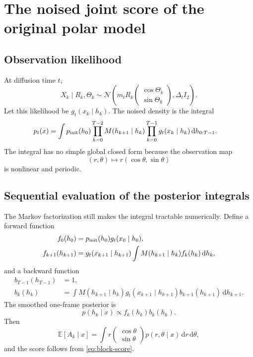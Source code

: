 \documentclass[11pt,a4paper]{article}
\newcommand{\E}{\mathbb{E}}
\newcommand{\N}{\mathcal{N}}
\newcommand{\dd}{\,\mathrm d}
\begin{document}
\section{The noised joint score of the original polar model}

\subsection{Observation likelihood}

At diffusion time $t$,
\begin{equation}
 X_k\mid R_k,\Theta_k
 \sim\N\left(
 m_tR_k
 \begin{pmatrix}\cos\Theta_k\\\sin\Theta_k\end{pmatrix},
 \Delta_t I_2
 \right).
 \label{eq:polar-likelihood}
\end{equation}
Let this likelihood be $g_t(x_k\mid h_k)$. The noised density is the integral
\begin{align}
 p_t(x)
 &=\int p_{\rm init}(h_0)
 \prod_{k=0}^{T-2}M(h_{k+1}\mid h_k)
 \prod_{k=0}^{T-1}g_t(x_k\mid h_k)
 \dd h_{0:T-1}.
 \label{eq:polar-noised-density}
\end{align}
The integral has no simple global closed form because the observation map
\[
 (r,\theta)\mapsto r(\cos\theta,\sin\theta)
\]
is nonlinear and periodic.

\subsection{Sequential evaluation of the posterior integrals}

The Markov factorization still makes the integral tractable numerically. Define a forward function
\begin{align}
 f_0(h_0)&=p_{\rm init}(h_0)g_t(x_0\mid h_0),\\
 f_{k+1}(h_{k+1})
 &=g_t(x_{k+1}\mid h_{k+1})
 \int M(h_{k+1}\mid h_k)f_k(h_k)\dd h_k,
 \label{eq:forward-recursion}
\end{align}
and a backward function
\begin{align}
 b_{T-1}(h_{T-1})&=1,\\
 b_k(h_k)
 &=\int M(h_{k+1}\mid h_k)
 g_t(x_{k+1}\mid h_{k+1})b_{k+1}(h_{k+1})\dd h_{k+1}.
 \label{eq:backward-recursion}
\end{align}
The smoothed one-frame posterior is
\begin{equation}
 p(h_k\mid x)\propto f_k(h_k)b_k(h_k).
 \label{eq:smoothed-posterior}
\end{equation}
Then
\begin{equation}
 \E[A_k\mid x]
 =\int r
 \begin{pmatrix}\cos\theta\\\sin\theta\end{pmatrix}
 p(r,\theta\mid x)\dd r\dd\theta,
 \label{eq:polar-posterior-mean}
\end{equation}
and the score follows from \cref{eq:block-score}.
\end{document}
